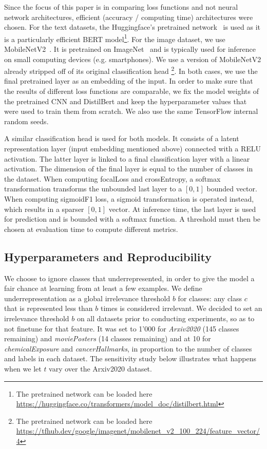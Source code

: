 Since the focus of this paper is in comparing loss functions and not neural network architectures, efficient  (accuracy / computing time) architectures were chosen.
For the text datasets, the Huggingface's pretrained network~\cite{distilBert} is used as it is a particularly efficient BERT model\footnote{The pretrained network can be loaded here \url{https://huggingface.co/transformers/model_doc/distilbert.html}}. For the image dataset, we use MobileNetV2~\cite{mobileNet}. It is pretrained on ImageNet~\cite{imagenet} and is typically used for inference on small computing devices (e.g. smartphones). We use a version of MobileNetV2 already stripped off of its original classification head  \footnote{The pretrained network can be loaded here \url{https://tfhub.dev/google/imagenet/mobilenet_v2_100_224/feature_vector/4}}. In both cases, we use the final pretrained layer as an embedding of the input. In order to make sure that the results of different loss functions are comparable, we fix the model weights of the pretrained CNN and DistilBert and keep the hyperparameter values that were used to train them from scratch. We also use the same TensorFlow internal random seeds.

A similar classification head is used for both models. It consists of a latent representation layer (input embedding mentioned above) connected with a RELU activation. The latter layer is linked to a final classification layer with a linear activation. The dimension of the final layer is equal to the number of classes in the dataset. When computing focalLoss and crossEntropy, a softmax transformation transforms the unbounded last layer to a $[0,1]$ bounded vector. When computing sigmoidF1 loss, a sigmoid transformation is operated instead, which results in a sparser $[0,1]$ vector. At inference time, the last layer is used for prediction and is bounded with a softmax function. A threshold must then be chosen at evaluation time to compute different metrics.


\subsection{Hyperparameters and Reproducibility}

We choose to ignore classes that underrepresented, in order to give the model a fair chance at learning from at least a few examples. We define underrepresentation as a global irrelevance threshold $b$ for classes: any class $c$ that is represented less than $b$ times is considered irrelevant. We decided to set an irrelevance threshold $b$ on all datasets prior to conducting experiments, so as to not finetune for that feature. It was set to 1'000 for \emph{Arxiv2020} (145 classes remaining) and \emph{moviePosters} (14 classes remaining) and at 10 for \emph{chemicalExposure} and \emph{cancerHallmarks}, in proportion to the number of classes and labels in each dataset. The sensitivity study below illustrates what happens when we let $t$ vary over the Arxiv2020 dataset.

